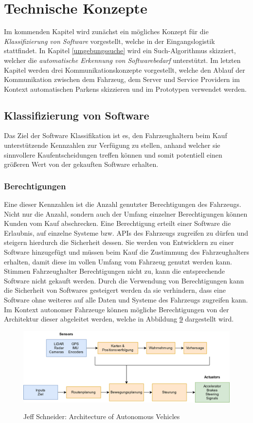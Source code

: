 \section{Technische Konzepte}\label{technische_konzepte}
Im kommenden Kapitel wird zunächst ein mögliches Konzept für die\textit{ Klassifizierung von Software} vorgestellt, welche in der Eingangslogistik stattfindet. In Kapitel \ref{umgebungssuche} wird ein Such-Algorithmus skizziert, welcher die \textit{automatische Erkennung von Softwarebedarf} unterstützt. Im letzten Kapitel werden drei Kommunikationskonzepte vorgestellt, welche den Ablauf der Kommunikation zwischen dem Fahrzeug, dem Server und Service Providern im Kontext automatischen Parkens skizzieren und im Prototypen verwendet werden.
\subsection{Klassifizierung von Software}\label{sw_klassifizierung}
Das Ziel der Software Klassifikation ist es, den Fahrzeughaltern beim Kauf unterstützende Kennzahlen zur Verfügung zu stellen, anhand welcher sie sinnvollere Kaufentscheidungen treffen können und somit potentiell einen größeren Wert von der gekauften Software erhalten.

\subsubsection{Berechtigungen}
Eine dieser Kennzahlen ist die Anzahl genutzter Berechtigungen des Fahrzeugs. Nicht nur die Anzahl, sondern auch der Umfang einzelner Berechtigungen können Kunden vom Kauf abschrecken.\cite[Vgl. S. 107]{android} Eine Berechtigung erteilt einer Software die Erlaubnis, auf einzelne Systeme bzw. APIs des Fahrzeugs zugreifen zu dürfen und steigern hierdurch die Sicherheit dessen. Sie werden von Entwicklern zu einer Software hinzugefügt und müssen beim Kauf die Zustimmung des Fahrzeughalters erhalten, damit diese im vollen Umfang vom Fahrzeug genutzt werden kann. Stimmen Fahrzeughalter Berechtigungen nicht zu, kann die entsprechende Software nicht gekauft werden. Durch die Verwendung von Berechtigungen kann die Sicherheit von Softwares gesteigert werden da sie verhindern, dass eine Software ohne weiteres auf alle Daten und Systeme des Fahrzeugs zugreifen kann. Im Kontext autonomer Fahrzeuge können mögliche Berechtigungen von der Architektur dieser abgeleitet werden, welche in Abbildung \hyperref[img:av_architecture]{9} dargestellt wird. 
\begin{figure}[H]
	\centering
	\includegraphics[width=0.95\columnwidth]{pictures/arichtecture_AV.png}
	\label{img:av_architecture}
	\caption{Jeff Schneider: Architecture of Autonomous Vehicles\cite{jschneider}}
\end{figure}


